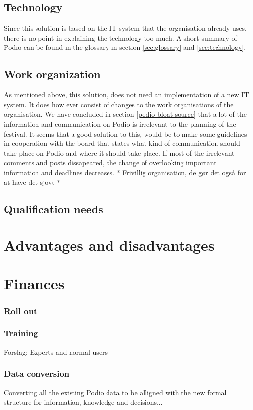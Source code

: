 \subsection{Technology}
Since this solution is based on the IT system that the organisation already uses, there is no point
in explaining the technology too much. A short summary of Podio can be found in the glossary in
section \ref{sec:glossary} and \ref{sec:technology}.

\subsection{Work organization}
As mentioned above, this solution, does not need an implementation of a new IT system. It does how
ever consist of changes to the work organisations of the organisation. 
We have concluded in section \ref{podio bloat source} that a lot of the information and
communication on Podio is irrelevant to the planning of the festival. It seems that a good solution
to this, would be to make some guidelines in cooperation with the board that states what kind of
communication should take place on Podio and where it should take place. If most of the irrelevant
comments and posts dissapeared, the change of overlooking important information and deadlines
decreases. 
* Frivillig organisation, de gør det også for at have det sjovt
* 

\subsection{Qualification needs}

\section{Advantages and disadvantages}

\section{Finances}

\subsubsection{Roll out}

\subsubsection{Training}
Forslag: Experts and normal users
\subsubsection{Data conversion}
Converting all the existing Podio data to be alligned with the new formal structure for information, knowledge and decisions...

